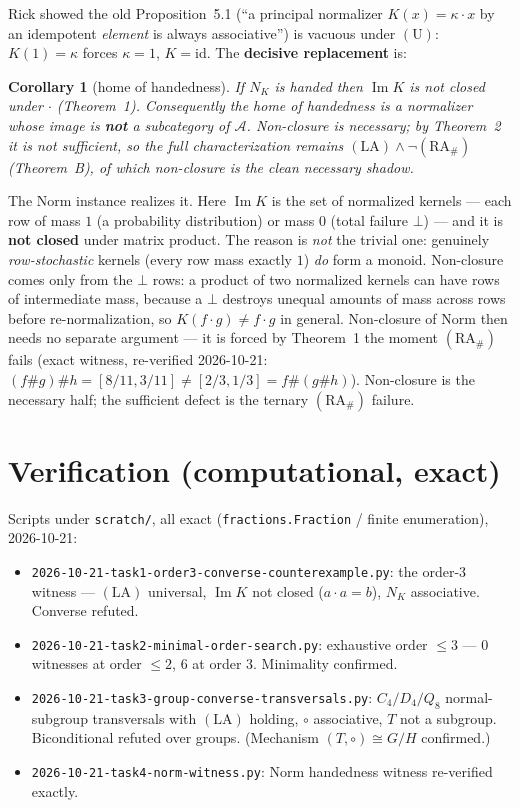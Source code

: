 \documentclass[11pt]{article}
\theoremstyle{plain}
\newtheorem{corollary}[theorem]{Corollary}
\theoremstyle{definition}
\theoremstyle{remark}
\newcommand{\Acat}{\mathcal{A}}
\renewcommand{\Im}{\operatorname{Im}}
\newcommand{\NK}{N_K}
\begin{document}
Rick showed the old Proposition~5.1 (``a principal normalizer $K(x)=\kappa\cdot x$ by an idempotent
\emph{element} is always associative'') is vacuous under $(\mathrm{U})$: $K(1)=\kappa$ forces
$\kappa=1$, $K=\mathrm{id}$. The \textbf{decisive replacement} is:

\begin{corollary}[home of handedness]
If $\NK$ is handed then $\Im K$ is not closed under $\cdot$ (Theorem~1). Consequently the home of
handedness is a normalizer whose image is \textbf{not} a subcategory of $\Acat$. Non-closure is
\emph{necessary}; by Theorem~2 it is \emph{not sufficient}, so the full characterization remains
$(\mathrm{LA}) \wedge \neg(\mathrm{RA}_\#)$ (Theorem~B), of which non-closure is the clean necessary
shadow.
\end{corollary}

The $\mathrm{Norm}$ instance realizes it. Here $\Im K$ is the set of normalized kernels --- each row
of mass $1$ (a probability distribution) or mass $0$ (total failure $\bot$) --- and it is
\textbf{not closed} under matrix product. The reason is \emph{not} the trivial one: genuinely
\emph{row-stochastic} kernels (every row mass exactly $1$) \emph{do} form a monoid. Non-closure
comes only from the $\bot$ rows: a product of two normalized kernels can have rows of intermediate
mass, because a $\bot$ destroys unequal amounts of mass across rows before re-normalization, so
$K(f\cdot g)\neq f\cdot g$ in general. Non-closure of $\mathrm{Norm}$ then needs no separate
argument --- it is forced by Theorem~1 the moment $(\mathrm{RA}_\#)$ fails (exact witness,
re-verified 2026-10-21: $(f\#g)\#h = [8/11,3/11] \neq [2/3,1/3] = f\#(g\#h)$). Non-closure is the
necessary half; the sufficient defect is the ternary $(\mathrm{RA}_\#)$ failure.

\section{Verification (computational, exact)}

Scripts under \texttt{scratch/}, all exact (\texttt{fractions.Fraction} / finite enumeration),
2026-10-21:
\begin{itemize}[leftmargin=1.6em]
\item \texttt{2026-10-21-task1-order3-converse-counterexample.py}: the order-3 witness ---
  $(\mathrm{LA})$ universal, $\Im K$ not closed ($a\cdot a=b$), $\NK$ associative. Converse
  refuted.
\item \texttt{2026-10-21-task2-minimal-order-search.py}: exhaustive order $\le3$ --- 0 witnesses at
  order $\le2$, 6 at order 3. Minimality confirmed.
\item \texttt{2026-10-21-task3-group-converse-transversals.py}: $C_4/D_4/Q_8$ normal-subgroup
  transversals with $(\mathrm{LA})$ holding, $\circ$ associative, $T$ not a subgroup. Biconditional
  refuted over groups. (Mechanism $(T,\circ)\cong G/H$ confirmed.)
\item \texttt{2026-10-21-task4-norm-witness.py}: $\mathrm{Norm}$ handedness witness re-verified
  exactly.
\end{itemize}
\end{document}
